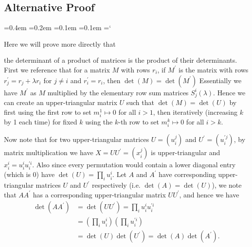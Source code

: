 
\subsection*{Alternative Proof}

{\ttfamily
{}\font=0.4em
\font=0.2em
\font=0.1em
\font=0.1em
\hyphenchar\font=`\-


\hypertarget{scripts_elementary_matrices_determinants_ii_product}{Here we will prove more directly that} the determinant of a product of matrices is the product of their determinants. First we reference that for a matrix $M$ with rows $r_i$, if $M^{\prime}$ is the matrix with rows $r^{\prime}_j = r_j + \lambda r_i$ for $j \neq i$ and $r^{\prime}_i = r_i$, then $\det(M) = \det(M^{\prime})$ Essentially we have $M^{\prime}$ as $M$ multiplied by the elementary row sum matrices $S^i_j(\lambda)$. Hence we can create an upper-triangular matrix $U$ such that $\det(M) = \det(U)$ by first using the first row to set $m_i^1 \mapsto 0$ for all $i > 1$, then iteratively (increasing $k$ by 1 each time) for fixed $k$ using the $k$-th row to set $m_i^k \mapsto 0$ for all $i > k$.

Now note that for two upper-triangular matrices $U = (u_i^j)$ and $U^{\prime} = (u_i^{\prime j})$, by matrix multiplication we have $X = UU^{\prime} = (x_i^j)$ is upper-triangular and $x_i^i = u_i^i u_i^{\prime i}$. Also since every permutation would contain a lower diagonal entry (which is 0) have $\det(U) = \prod_i u_i^i$. Let $A$ and $A^{\prime}$ have corresponding upper-triangular matrices $U$ and $U^{\prime}$ respectively (i.e. $\det(A) = \det(U)$), we note that $AA^{\prime}$ has a corresponding upper-triangular matrix $UU^{\prime}$, and hence we have
\begin{align*}
\det(A A^{\prime}) & = \det(U U^{\prime}) = \prod_i u_i^i u_i^{\prime i}
\\ & = \left( \prod_i u_i^i \right) \left( \prod_i u_i^{\prime i} \right)
\\ & = \det(U) \det(U^{\prime}) = \det(A) \det(A^{\prime}).
\end{align*}


} %

